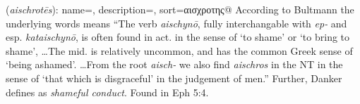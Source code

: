 \item[Shameful,]

(\textit{aischrotēs}):
{
    name=,
    description={},
    sort=αισχροτης@
}
According to Bultmann the underlying words means ``The verb \emph{aischynō}, fully interchangable with \emph{ep-} and esp. \emph{kataischynō}, is often found in act. in the sense of `to shame' or `to bring to shame', \ldots The mid. is relatively uncommon, and has the common Greek sense of `being ashamed'. \ldots From the root \emph{aisch-} we also find \emph{aischros} in the NT in the sense of `that which is disgraceful' in the judgement of men.'' 
Further, Danker defines  as \emph{shameful conduct}. 
Found in Eph 5:4.
